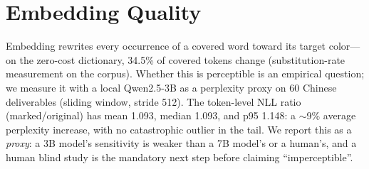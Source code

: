 \section{Embedding Quality}
\label{sec:quality}
Embedding rewrites every occurrence of a covered word toward its target
color---on the zero-cost dictionary, 34.5\% of covered tokens change
(substitution-rate measurement on the corpus). Whether this is perceptible
is an empirical question; we measure it with a local Qwen2.5-3B as a
perplexity proxy on 60 Chinese deliverables (sliding window, stride 512).
The token-level NLL ratio (marked/original) has mean 1.093, median 1.093,
and p95 1.148: a $\sim$9\% average perplexity increase, with no catastrophic
outlier in the tail. We report this as a \emph{proxy}: a 3B model's
sensitivity is weaker than a 7B model's or a human's, and a human blind
study is the mandatory next step before claiming ``imperceptible''.
